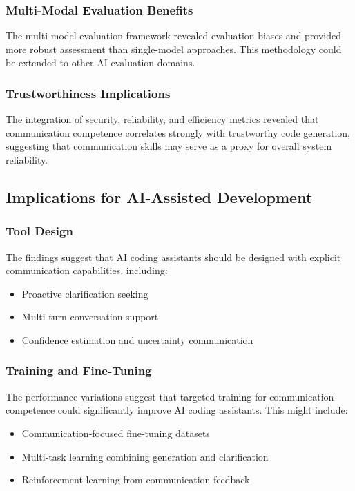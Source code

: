 \documentclass[conference]{IEEEtran}
\begin{document}
\subsubsection{Multi-Modal Evaluation Benefits}

The multi-model evaluation framework revealed evaluation biases and provided more robust assessment than single-model approaches. This methodology could be extended to other AI evaluation domains.

\subsubsection{Trustworthiness Implications}

The integration of security, reliability, and efficiency metrics revealed that communication competence correlates strongly with trustworthy code generation, suggesting that communication skills may serve as a proxy for overall system reliability.

\subsection{Implications for AI-Assisted Development}

\subsubsection{Tool Design}

The findings suggest that AI coding assistants should be designed with explicit communication capabilities, including:

\begin{itemize}
    \item Proactive clarification seeking
    \item Multi-turn conversation support
    \item Confidence estimation and uncertainty communication
\end{itemize}

\subsubsection{Training and Fine-Tuning}

The performance variations suggest that targeted training for communication competence could significantly improve AI coding assistants. This might include:

\begin{itemize}
    \item Communication-focused fine-tuning datasets
    \item Multi-task learning combining generation and clarification
    \item Reinforcement learning from communication feedback
\end{itemize}
\end{document}
